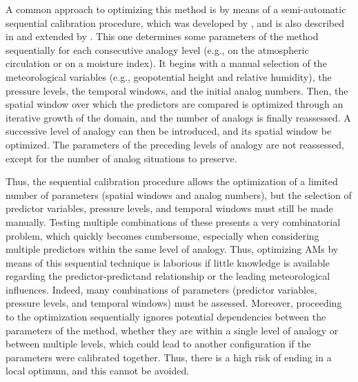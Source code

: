 \documentclass{ametsoc}
\begin{document}
A common approach to optimizing this method is by means of a semi-automatic sequential calibration procedure, which was developed by \citet{Bontron2004}, and is also described in \citet{BenDaoud2016} and extended by \citet{Radanovics2013}. This one determines some parameters of the method sequentially for each consecutive analogy level (e.g., on the atmospheric circulation or on a moisture index). It begins with a manual selection of the meteorological variables (e.g., geopotential height and relative humidity), the pressure levels, the temporal windows, and the initial analog numbers. Then, the spatial window over which the predictors are compared is optimized through an iterative growth of the domain, and the number of analogs is finally reassessed. A successive level of analogy can then be introduced, and its spatial window be optimized. The parameters of the preceding levels of analogy are not reassessed, except for the number of analog situations to preserve.

Thus, the sequential calibration procedure allows the optimization of a limited number of parameters (spatial windows and analog numbers), but the selection of predictor variables, pressure levels, and temporal windows must still be made manually. Testing multiple combinations of these presents a very combinatorial problem, which quickly becomes cumbersome, especially when considering multiple predictors within the same level of analogy. Thus, optimizing AMs by means of this sequential technique is laborious if little knowledge is available regarding the predictor-predictand relationship or the leading meteorological influences. Indeed, many combinations of parameters (predictor variables, pressure levels, and temporal windows) must be assessed. Moreover, proceeding to the optimization sequentially ignores potential dependencies between the parameters of the method, whether they are within a single level of analogy or between multiple levels, which could lead to another configuration if the parameters were calibrated together. Thus, there is a high risk of ending in a local optimum, and this cannot be avoided. 
\end{document}
